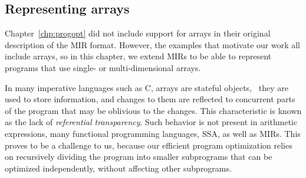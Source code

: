 

\subsection{Representing arrays}
\label{lo:sub:extending_the_translation_to_handle_arrays}

Chapter~\ref{chp:progopt} did not include support for arrays in their original
description of the MIR format. However, the examples that motivate our work
all include arrays, so in this chapter, we extend MIRs to be able to represent
programs that use single- or multi-dimensional arrays.

In many imperative languages such as C, arrays are stateful objects, \ie~they
are used to store information, and changes to them are reflected to concurrent
parts of the program that may be oblivious to the changes.  This characteristic
is known as the lack of \emph{referential transparency}.  Such behavior is not
present in arithmetic expressions, many functional programming languages, SSA,
as well as MIRs.  This proves to be a challenge to us, because our efficient
program optimization relies on recursively dividing the program into smaller
subprograms that can be optimized independently, without affecting other
subprograms.

